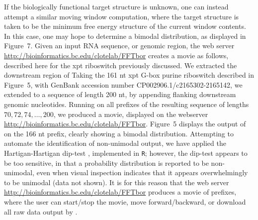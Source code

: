 If the biologically functional target structure is unknown, one can
instead attempt a similar moving window computation, where the target
structure is taken to be the minimum free energy structure of the
current window contents. In this case, one may hope to determine a
bimodal distribution, as displayed in Figure~7.
Given an input RNA sequence, or genomic region, the
web server \url{http://bioinformatics.bc.edu/clotelab/FFTbor}
creates a movie as follows, described here for the xpt riboswitch
previously discussed.  We extracted the downstream region of
Taking the
161 nt xpt G-box purine riboswitch described in Figure~5,
with GenBank accession number CP002906.1/c2165302-2165142, we extended
to a sequence of length 200 nt, by appending flanking
downstream genomic nucleotides.  Running \fftbor on all
prefixes of the resulting sequence of lengths
$70,72,74,\ldots,200$, we produced a movie, displayed on the webserver
\url{http://bioinformatics.bc.edu/clotelab/FFTbor}.
Figure~5 displays the output of \fftbor on the
166 nt prefix, clearly showing a bimodal distribution. Attempting to
automate the identification of non-unimodal \fftbor output, we have
applied the Hartigan-Hartigan dip-test \cite{hartiganDipTest},
implemented in {\tt R}; however,
the dip-test appears to be too sensitive, in that a probability distribution
is reported to be non-unimodal, even when visual inspection indicates that
it appears overwhelmingly to be unimodal (data not shown). It is for this
reason that the web server
\url{http://bioinformatics.bc.edu/clotelab/FFTbor} produces a movie of
prefixes, where the user can start/stop the movie,
move forward/backward, or download all raw data output by \fftbor.


